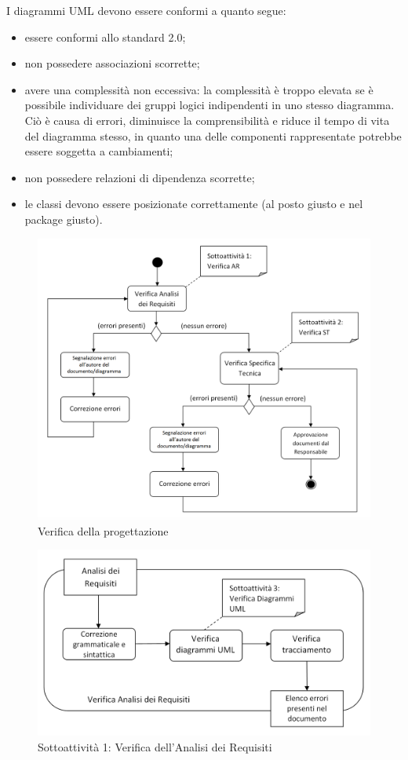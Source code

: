 I diagrammi UML devono essere conformi a quanto segue:
\begin{itemize}
	\item essere conformi allo standard 2.0;
	\item non possedere associazioni scorrette;
	\item avere una complessità non eccessiva: la complessità è troppo elevata se è possibile individuare dei gruppi logici indipendenti in uno stesso diagramma. Ciò è causa di errori, diminuisce la comprensibilità e riduce il tempo di vita del diagramma stesso, in quanto una delle componenti rappresentate potrebbe essere soggetta a cambiamenti;
	\item non possedere relazioni di dipendenza scorrette;
	\item le classi devono essere posizionate correttamente (al posto giusto e nel package giusto).
\end{itemize}

\begin{figure}[h!]
	\centering
	\includegraphics[scale=.45]{img/schema_RP.png}
	\caption{Verifica della progettazione}
\end{figure}

\begin{figure}[h!]
	\centering
	\includegraphics[scale=.45]{img/schema_AR.png}
	\caption{Sottoattività 1: Verifica dell'Analisi dei Requisiti}
\end{figure}

